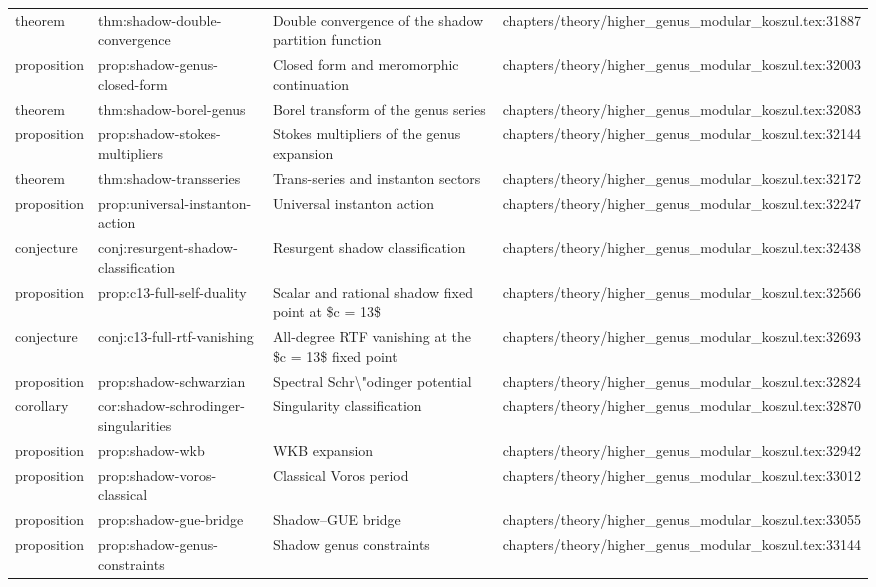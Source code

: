 \documentclass[11pt]{article}
\begin{document}
\begin{longtable}{L{0.10\textwidth}L{0.26\textwidth}L{0.42\textwidth}L{0.22\textwidth}}
theorem & thm:shadow-double-convergence & Double convergence of the shadow partition function & chapters/theory/higher\_genus\_modular\_koszul.tex:31887\\
proposition & prop:shadow-genus-closed-form & Closed form and meromorphic continuation & chapters/theory/higher\_genus\_modular\_koszul.tex:32003\\
theorem & thm:shadow-borel-genus & Borel transform of the genus series & chapters/theory/higher\_genus\_modular\_koszul.tex:32083\\
proposition & prop:shadow-stokes-multipliers & Stokes multipliers of the genus expansion & chapters/theory/higher\_genus\_modular\_koszul.tex:32144\\
theorem & thm:shadow-transseries & Trans-series and instanton sectors & chapters/theory/higher\_genus\_modular\_koszul.tex:32172\\
proposition & prop:universal-instanton-action & Universal instanton action & chapters/theory/higher\_genus\_modular\_koszul.tex:32247\\
conjecture & conj:resurgent-shadow-classification & Resurgent shadow classification & chapters/theory/higher\_genus\_modular\_koszul.tex:32438\\
proposition & prop:c13-full-self-duality & Scalar and rational shadow fixed point at \$c = 13\$ & chapters/theory/higher\_genus\_modular\_koszul.tex:32566\\
conjecture & conj:c13-full-rtf-vanishing & All-degree RTF vanishing at the \$c = 13\$ fixed point & chapters/theory/higher\_genus\_modular\_koszul.tex:32693\\
proposition & prop:shadow-schwarzian & Spectral Schr\textbackslash{}"odinger potential & chapters/theory/higher\_genus\_modular\_koszul.tex:32824\\
corollary & cor:shadow-schrodinger-singularities & Singularity classification & chapters/theory/higher\_genus\_modular\_koszul.tex:32870\\
proposition & prop:shadow-wkb & WKB expansion & chapters/theory/higher\_genus\_modular\_koszul.tex:32942\\
proposition & prop:shadow-voros-classical & Classical Voros period & chapters/theory/higher\_genus\_modular\_koszul.tex:33012\\
proposition & prop:shadow-gue-bridge & Shadow--GUE bridge & chapters/theory/higher\_genus\_modular\_koszul.tex:33055\\
proposition & prop:shadow-genus-constraints & Shadow genus constraints & chapters/theory/higher\_genus\_modular\_koszul.tex:33144\\

\end{longtable}
\end{document}
